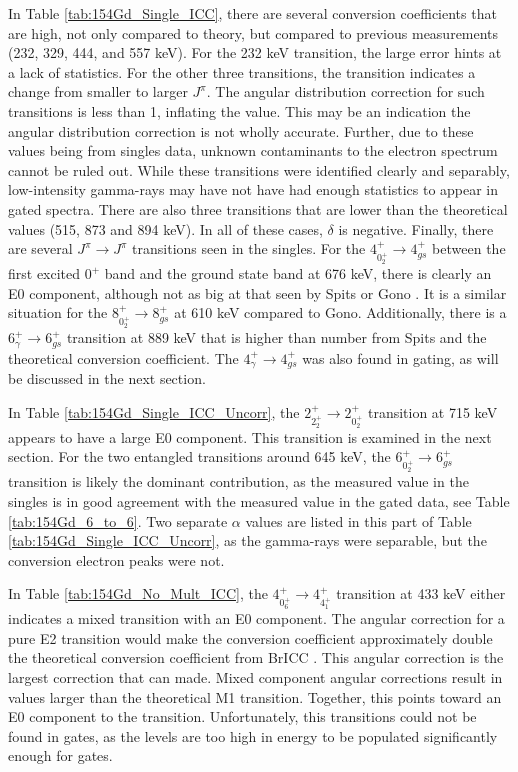 In Table \ref{tab:154Gd_Single_ICC}, there are several conversion coefficients that are high, not only compared to theory, but compared to previous measurements (232, 329, 444, and 557 keV). For the 232 keV transition, the large error hints at a lack of statistics.  For the other three transitions, the transition indicates a change from smaller to larger $J^{\pi}$. The angular distribution correction for such transitions is less than 1, inflating the value. This may be an indication the angular distribution correction is not wholly accurate. Further, due to these values being from singles data, unknown contaminants to the electron spectrum cannot be ruled out. While these transitions were identified clearly and separably, low-intensity gamma-rays may have not have had enough statistics to appear in gated spectra. There are also three transitions that are lower than the theoretical values (515, 873 and 894 keV). In all of these cases, $\delta$ is negative. Finally, there are several $J^{\pi}\rightarrow J^{\pi}$ transitions seen in the singles. For the $4^+_{0^+_2}\rightarrow 4^+_{gs}$ between the first excited $0^+$ band and the ground state band at 676 keV, there is clearly an E0 component, although not as big at that seen by Spits or Gono \cite{spits96:_154gd, gono74:_154gd_e0}. It is a similar situation for the $8^+_{0^+_2}\rightarrow 8^+_{gs}$ at 610 keV compared to Gono. Additionally, there is a $6_{\gamma}^+\rightarrow 6^+_{gs}$ transition at 889 keV that is higher than number from Spits and the theoretical conversion coefficient. The $4^+_{\gamma}\rightarrow 4^+_{gs}$ was also found in gating, as will be discussed in the next section.

In Table \ref{tab:154Gd_Single_ICC_Uncorr}, the $2^+_{2^+_2}\rightarrow 2^+_{0^+_2}$ transition at 715 keV appears to have a large E0 component. This transition is examined in the next section. For the two entangled transitions around 645 keV, the $6^+_{0^+_2}\rightarrow 6^+_{gs}$ transition is likely the dominant contribution, as the measured value in the singles is in good agreement with the measured value in the gated data, see Table \ref{tab:154Gd_6_to_6}. Two separate $\alpha$ values are listed in this part of Table \ref{tab:154Gd_Single_ICC_Uncorr}, as the gamma-rays were separable, but the conversion electron peaks were not.

In Table \ref{tab:154Gd_No_Mult_ICC}, the $4^+_{0^+_6}\rightarrow 4^+_{4^+_1}$ transition at 433 keV either indicates a mixed transition with an E0 component. The angular correction for a pure E2 transition would make the conversion coefficient approximately double the theoretical conversion coefficient from BrICC \citep{kibedi08:_BRICC}. This angular correction is the largest correction that can made. Mixed component angular corrections result in values larger than the theoretical M1 transition. Together, this points toward an E0 component to the transition. Unfortunately, this transitions could not be found in gates, as the levels are too high in energy to be populated significantly enough for gates.

